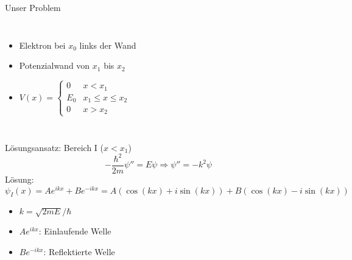 \documentclass{beamer}
\begin{document}
    \begin{frame}{Unser Problem}
        \begin{columns}
            \begin{itemize}
                \item Elektron bei $x_0$ links der Wand
                \item Potenzialwand von $x_1$ bis $x_2$
                \item $V(x) = \begin{cases}
                                  0 & x < x_1 \\
                                  E_0 & x_1 \leq x \leq x_2 \\
                                  0 & x > x_2
                \end{cases}$
            \end{itemize}

        \end{columns}
    \end{frame}


    \begin{frame}{Lösungsansatz: Bereich I ($x < x_1$)}
        \[
            -\frac{\hbar^2}{2m}\psi'' = E\psi \Rightarrow \psi'' = -k^2\psi
        \]
        Lösung:
        \[
            \psi_I(x) = Ae^{ikx} + Be^{-ikx} = A(\cos(kx) + i\sin(kx)) + B(\cos(kx) - i\sin(kx))
        \]
        \begin{itemize}
            \item $k = \sqrt{2mE}/\hbar$
            \item $Ae^{ikx}$: Einlaufende Welle
            \item $Be^{-ikx}$: Reflektierte Welle
        \end{itemize}
    \end{frame}
\end{document}
